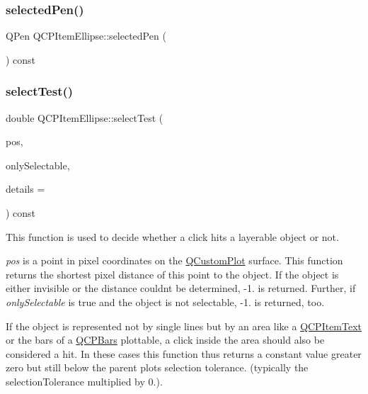 \subsubsection{\texorpdfstring{selectedPen()}{selectedPen()}}
{\footnotesize\ttfamily Q\+Pen Q\+C\+P\+Item\+Ellipse\+::selected\+Pen (\begin{DoxyParamCaption}{ }\end{DoxyParamCaption}) const\hspace{0.3cm}{\ttfamily [inline]}}

\mbox{\label{class_q_c_p_item_ellipse_ab6e2b8a29695c606c7731e498297ca29}} 
\subsubsection{\texorpdfstring{selectTest()}{selectTest()}}
{\footnotesize\ttfamily double Q\+C\+P\+Item\+Ellipse\+::select\+Test (\begin{DoxyParamCaption}\item[{const Q\+PointF \&}]{pos,  }\item[{bool}]{only\+Selectable,  }\item[{Q\+Variant $\ast$}]{details = {} }\end{DoxyParamCaption}) const\hspace{0.3cm}{\ttfamily [virtual]}}

This function is used to decide whether a click hits a layerable object or not.

{\itshape pos} is a point in pixel coordinates on the \mbox{\hyperlink{class_q_custom_plot}{Q\+Custom\+Plot}} surface. This function returns the shortest pixel distance of this point to the object. If the object is either invisible or the distance couldn\textquotesingle{}t be determined, -\/1. is returned. Further, if {\itshape only\+Selectable} is true and the object is not selectable, -\/1. is returned, too.

If the object is represented not by single lines but by an area like a \mbox{\hyperlink{class_q_c_p_item_text}{Q\+C\+P\+Item\+Text}} or the bars of a \mbox{\hyperlink{class_q_c_p_bars}{Q\+C\+P\+Bars}} plottable, a click inside the area should also be considered a hit. In these cases this function thus returns a constant value greater zero but still below the parent plot\textquotesingle{}s selection tolerance. (typically the selection\+Tolerance multiplied by 0.).

